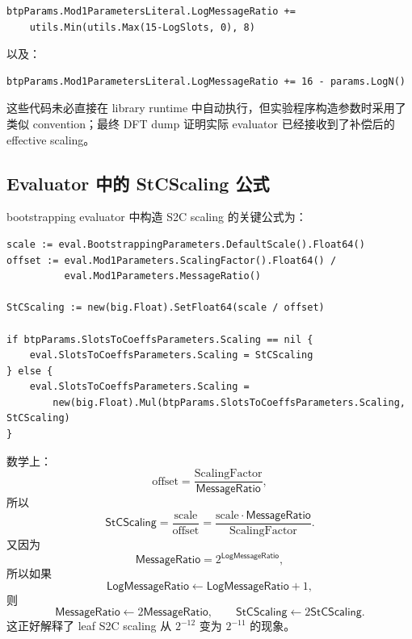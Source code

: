 \documentclass[UTF8,a4paper,11pt]{ctexart}
\newcommand{\LogMessageRatio}{\mathsf{LogMessageRatio}}
\newcommand{\MessageRatio}{\mathsf{MessageRatio}}
\newcommand{\StCScaling}{\mathsf{StCScaling}}
\begin{document}
\begin{lstlisting}[style=gostyle,caption={LogMessageRatio 小参数补偿示例}]
btpParams.Mod1ParametersLiteral.LogMessageRatio +=
    utils.Min(utils.Max(15-LogSlots, 0), 8)
\end{lstlisting}

以及：
\begin{lstlisting}[style=gostyle,caption={按 LogN 的 MessageRatio 补偿示例}]
btpParams.Mod1ParametersLiteral.LogMessageRatio += 16 - params.LogN()
\end{lstlisting}

这些代码未必直接在 library runtime 中自动执行，但实验程序构造参数时采用了类似 convention；最终 DFT dump 证明实际 evaluator 已经接收到了补偿后的 effective scaling。

\subsection{Evaluator 中的 StCScaling 公式}

bootstrapping evaluator 中构造 S2C scaling 的关键公式为：

\begin{lstlisting}[style=gostyle,caption={StCScaling 构造逻辑}]
scale := eval.BootstrappingParameters.DefaultScale().Float64()
offset := eval.Mod1Parameters.ScalingFactor().Float64() /
          eval.Mod1Parameters.MessageRatio()

StCScaling := new(big.Float).SetFloat64(scale / offset)

if btpParams.SlotsToCoeffsParameters.Scaling == nil {
    eval.SlotsToCoeffsParameters.Scaling = StCScaling
} else {
    eval.SlotsToCoeffsParameters.Scaling =
        new(big.Float).Mul(btpParams.SlotsToCoeffsParameters.Scaling, StCScaling)
}
\end{lstlisting}

数学上：
\begin{equation}
\mathrm{offset}
=
\frac{\mathrm{ScalingFactor}}{\MessageRatio},
\end{equation}
所以
\begin{equation}
\StCScaling
=
\frac{\mathrm{scale}}{\mathrm{offset}}
=
\frac{\mathrm{scale}\cdot\MessageRatio}{\mathrm{ScalingFactor}}.
\end{equation}
又因为
\begin{equation}
\MessageRatio=2^{\LogMessageRatio},
\end{equation}
所以如果
\begin{equation}
\LogMessageRatio\leftarrow\LogMessageRatio+1,
\end{equation}
则
\begin{equation}
\MessageRatio\leftarrow2\MessageRatio,
\qquad
\StCScaling\leftarrow2\StCScaling.
\end{equation}
这正好解释了 leaf S2C scaling 从 $2^{-12}$ 变为 $2^{-11}$ 的现象。
\end{document}
